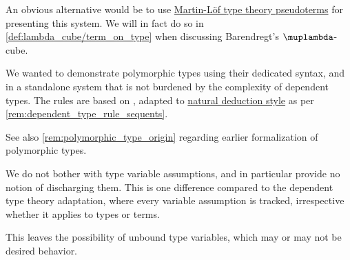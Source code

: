 \begin{comments}
  \item An obvious alternative would be to use \hyperref[def:mltt_pseudoterm]{Martin-L\"of type theory pseudoterms} for presenting this system. We will in fact do so in \cref{def:lambda_cube/term_on_type} when discussing Barendregt's \( \muplambda \)-cube.

  We wanted to demonstrate polymorphic types using their dedicated syntax, and in a standalone system that is not burdened by the complexity of dependent types. The rules are based on \cite[def. 5.1.3]{Barendregt1992LambdaCalculiWithTypes}, adapted to \hyperref[rem:natural_deduction_in_sequent_style]{natural deduction style} as per \cref{rem:dependent_type_rule_sequents}.

  See also \cref{rem:polymorphic_type_origin} regarding earlier formalization of polymorphic types.

  \item We do not bother with type variable assumptions, and in particular provide no notion of discharging them. This is one difference compared to the dependent type theory adaptation, where every variable assumption is tracked, irrespective whether it applies to types or terms.

  This leaves the possibility of unbound type variables, which may or may not be desired behavior.
\end{comments}

